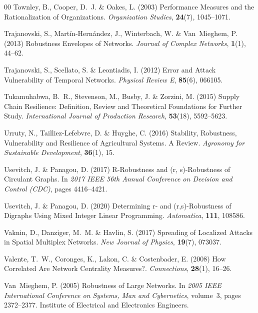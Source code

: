 \documentclass{comnet-mod}
\begin{document}
\begin{thebibliography}{00}
Townley, B., Cooper, D.~J. {\&} Oakes, L. (2003)  {Performance Measures and the
  Rationalization of Organizations}. {\em {Organization Studies}},
  \textbf{24}(7), 1045--1071.

Trajanovski, S., {Mart{\'i}n-Hern{\'a}ndez}, J., Winterbach, W. {\&}
  Van~Mieghem, P. (2013)  {Robustness Envelopes of Networks}. {\em {Journal of
  Complex Networks}}, \textbf{1}(1), 44--62.

Trajanovski, S., Scellato, S. {\&} Leontiadis, I. (2012)  {Error and Attack
  Vulnerability of Temporal Networks}. {\em {Physical Review E}},
  \textbf{85}(6), 066105.

Tukamuhabwa, B.~R., Stevenson, M., Busby, J. {\&} Zorzini, M. (2015)  {Supply
  Chain Resilience: {{Definition}}, Review and Theoretical Foundations for
  Further Study}. {\em {International Journal of Production Research}},
  \textbf{53}(18), 5592--5623.

Urruty, N., {Tailliez-Lefebvre}, D. {\&} Huyghe, C. (2016)  {Stability,
  Robustness, Vulnerability and Resilience of Agricultural Systems. {{A}}
  Review}. {\em {Agronomy for Sustainable Development}}, \textbf{36}(1), 15.

Usevitch, J. {\&} Panagou, D. (2017)  {R-{{Robustness}} and (r, s)-Robustness
  of Circulant Graphs}. In {\em {2017 {{IEEE}} 56th {{Annual Conference}} on
  {{Decision}} and {{Control}} ({{CDC}})}}, pages 4416--4421.

Usevitch, J. {\&} Panagou, D. (2020)  {Determining r- and (r,s)-Robustness of
  Digraphs Using Mixed Integer Linear Programming}. {\em {Automatica}},
  \textbf{111}, 108586.

Vaknin, D., Danziger, M.~M. {\&} Havlin, S. (2017)  {Spreading of Localized
  Attacks in Spatial Multiplex Networks}. {\em {New Journal of Physics}},
  \textbf{19}(7), 073037.

Valente, T.~W., Coronges, K., Lakon, C. {\&} Costenbader, E. (2008)  {How
  Correlated Are Network Centrality Measures?}. {\em {Connections}},
  \textbf{28}(1), 16--26.

Van~Mieghem, P. (2005)  {Robustness of Large Networks}. In {\em {2005 {{IEEE}}
  International Conference on Systems, Man and Cybernetics}}, volume~3, pages
  2372--2377. {Institute of Electrical and Electronics Engineers}.


\end{thebibliography}
\end{document}
